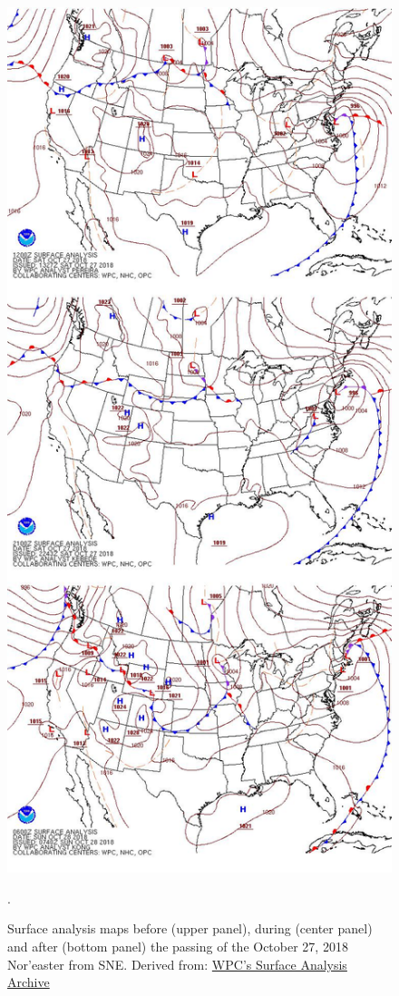 \begin{figure}[H]
\centering
\includegraphics[width=0.7\linewidth]{Figures/Chapter5/noreaster_oct18_sa.jpg}
\caption{Surface analysis maps before (upper panel), during (center panel) and after (bottom panel) the passing of the October 27, 2018 Nor'easter from SNE. Derived from: \href{https://www.wpc.ncep.noaa.gov/archives/web_pages/sfc/sfc_archive.php}{WPC's Surface Analysis Archive}}.
\label{fig:noreaster_oct18_sa}
\end{figure}



